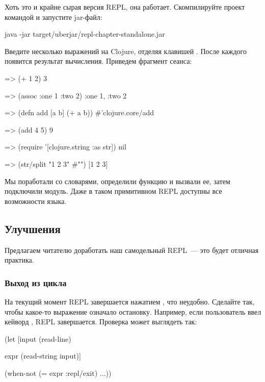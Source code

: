 Хоть это и крайне сырая версия REPL, она работает. Скомпилируйте проект командой  и запустите jar-файл:

\begin{english}
  \begin{clojure}
java -jar target/uberjar/repl-chapter-standalone.jar
  \end{clojure}
\end{english}

Введите несколько выражений на Clojure, отделяя клавишей \enter. После каждого появится результат вычисления. Приведем фрагмент сеанса:

\begin{english}
  \begin{clojure}
=> (+ 1 2)
3

=> (assoc {:one 1} :two 2)
{:one 1, :two 2}

=> (defn add [a b] (+ a b))
#'clojure.core/add

=> (add 4 5)
9

=> (require '[clojure.string :as str])
nil

=> (str/split "1 2 3" #"\s")
[1 2 3]
  \end{clojure}
\end{english}

Мы поработали со словарями, определили функцию и вызвали ее, затем подключили модуль. Даже в таком примитивном REPL доступны все возможности языка.

\subsection{Улучшения}

Предлагаем читателю доработать наш самодельный REPL~--- это будет отличная практика.

\subsubsection{Выход из цикла}

На текущий момент REPL завершается нажатием , что неудобно. Сделайте так, чтобы какое-то выражение означало остановку. Например, если пользователь ввел кейворд , REPL завершается. Проверка может выглядеть так:

\begin{english}
  \begin{clojure}
(let [input
      (read-line)

      expr
      (read-string input)]

  (when-not (= expr :repl/exit)
    ...))
  \end{clojure}
\end{english}

